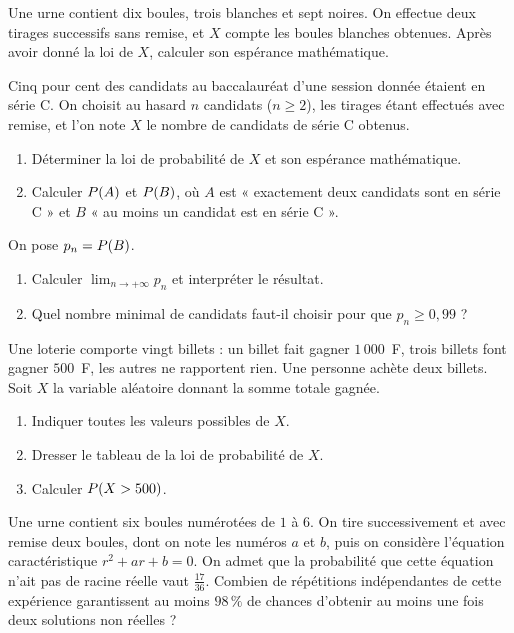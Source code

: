 \begin{annales}
Une urne contient dix boules, trois blanches et sept noires. On effectue deux
tirages successifs sans remise, et $X$ compte les boules blanches obtenues.
Après avoir donné la loi de $X$, calculer son espérance mathématique.

Cinq pour cent des candidats au baccalauréat d'une session donnée étaient en
série C. On choisit au hasard $n$ candidats ($n \geq 2$), les tirages étant
effectués avec remise, et l'on note $X$ le nombre de candidats de série C
obtenus.
\begin{enumerate}[label=\textbf{\alph*)}, leftmargin=*, itemsep=0.15em]
  \item Déterminer la loi de probabilité de $X$ et son espérance
        mathématique.
  \item Calculer $P\!\left(A\right)$ et $P\!\left(B\right)$, où $A$ est « exactement deux
        candidats sont en série C » et $B$ « au moins un candidat est en série
        C ».
\end{enumerate}

On pose $p_{n} = P\!\left(B\right)$.
\begin{enumerate}[label=\textbf{\alph*)}, leftmargin=*, itemsep=0.15em]
  \item Calculer $\lim_{n\to+\infty}p_{n}$ et interpréter le résultat.
  \item Quel nombre minimal de candidats faut-il choisir pour que
        $p_{n} \geq 0{,}99$ ?
\end{enumerate}

Une loterie comporte vingt billets : un billet fait gagner $1\,000$~F, trois
billets font gagner $500$~F, les autres ne rapportent rien. Une personne
achète deux billets. Soit $X$ la variable aléatoire donnant la somme totale
gagnée.
\begin{enumerate}[label=\textbf{\alph*)}, leftmargin=*, itemsep=0.15em]
  \item Indiquer toutes les valeurs possibles de $X$.
  \item Dresser le tableau de la loi de probabilité de $X$.
  \item Calculer $P\!\left(X>500\right)$.
\end{enumerate}

Une urne contient six boules numérotées de $1$ à $6$. On tire successivement
et avec remise deux boules, dont on note les numéros $a$ et $b$, puis on
considère l'équation caractéristique $r^{2}+ar+b = 0$. On admet que la
probabilité que cette équation n'ait pas de racine réelle vaut
$\frac{17}{36}$. Combien de répétitions indépendantes de cette expérience
garantissent au moins $98\,\%$ de chances d'obtenir au moins une fois deux
solutions non réelles ?
\end{annales}


